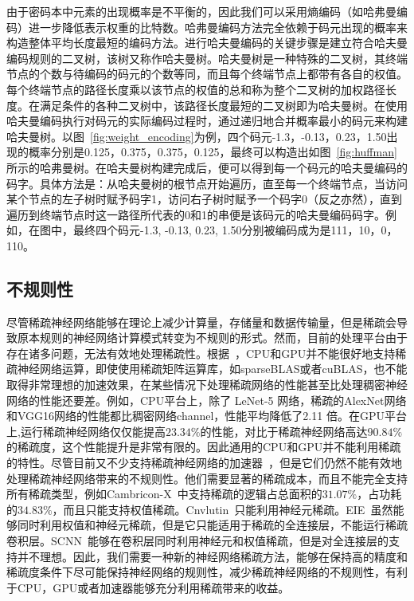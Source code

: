 由于密码本中元素的出现概率是不平衡的，因此我们可以采用熵编码（如哈弗曼编码）进一步降低表示权重的比特数。哈弗曼编码方法完全依赖于码元出现的概率来构造整体平均长度最短的编码方法。进行哈夫曼编码的关键步骤是建立符合哈夫曼编码规则的二叉树，该树又称作哈夫曼树。哈夫曼树是一种特殊的二叉树，其终端节点的个数与待编码的码元的个数等同，而且每个终端节点上都带有各自的权值。每个终端节点的路径长度乘以该节点的权值的总和称为整个二叉树的加权路径长度。在满足条件的各种二叉树中，该路径长度最短的二叉树即为哈夫曼树。在使用哈夫曼编码执行对码元的实际编码过程时，通过递归地合并概率最小的码元来构建哈夫曼树。以图~\ref{fig:weight_encoding}为例，四个码元-1.3，-0.13，0.23，1.50出现的概率分别是0.125，0.375，0.375，0.125，最终可以构造出如图~\ref{fig:huffman}所示的哈弗曼树。在哈夫曼树构建完成后，便可以得到每一个码元的哈夫曼编码的码字。具体方法是：从哈夫曼树的根节点开始遍历，直至每一个终端节点，当访问某个节点的左子树时赋予码字1，访问右子树时赋予一个码字0（反之亦然），直到遍历到终端节点时这一路径所代表的0和1的串便是该码元的哈夫曼编码码字。例如，在图中，最终四个码元-1.3, -0.13, 0.23, 1.50分别被编码成为是111，10，0，110。

\subsection{不规则性}
尽管稀疏神经网络能够在理论上减少计算量，存储量和数据传输量，但是稀疏会导致原本规则的神经网络计算模式转变为不规则的形式。然而，目前的处理平台由于存在诸多问题，无法有效地处理稀疏性。根据~\cite{zhang2016cambricon}，CPU和GPU并不能很好地支持稀疏神经网络运算，即使使用稀疏矩阵运算库，如sparseBLAS或者cuBLAS，也不能取得非常理想的加速效果，在某些情况下处理稀疏网络的性能甚至比处理稠密神经网络的性能还要差。例如，CPU平台上，除了 LeNet-5 网络，稀疏的AlexNet网络和VGG16网络的性能都比稠密网络channel，性能平均降低了2.11 倍。在GPU平台上,运行稀疏神经网络仅仅能提高$23.34\%$的性能，对比于稀疏神经网络高达$90.84\%$的稀疏度，这个性能提升是非常有限的。因此通用的CPU和GPU并不能利用稀疏的特性。尽管目前又不少支持稀疏神经网络的加速器~\cite{zhang2016cambricon, albericio2016cnvlutin, han2016eie, han2017ese, angshuman2017scnn}，但是它们仍然不能有效地处理稀疏神经网络带来的不规则性。他们需要显著的稀疏成本，而且不能完全支持所有稀疏类型，例如Cambricon-X~\cite{zhang2016cambricon}中支持稀疏的逻辑占总面积的$31.07\%$，占功耗的$34.83\%$，而且只能支持权值稀疏。Cnvlutin~\cite{albericio2016cnvlutin}只能利用神经元稀疏。EIE~\cite{han2016eie}虽然能够同时利用权值和神经元稀疏，但是它只能适用于稀疏的全连接层，不能运行稀疏卷积层。SCNN~\cite{angshuman2017scnn}能够在卷积层同时利用神经元和权值稀疏，但是对全连接层的支持并不理想。因此，我们需要一种新的神经网络稀疏方法，能够在保持高的精度和稀疏度条件下尽可能保持神经网络的规则性，减少稀疏神经网络的不规则性，有利于CPU，GPU或者加速器能够充分利用稀疏带来的收益。


